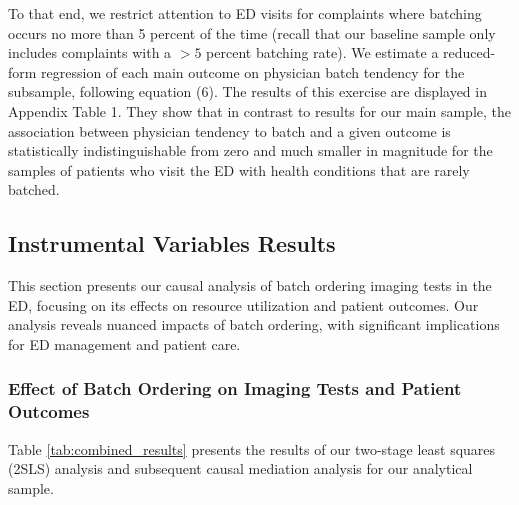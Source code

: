 \documentclass[,,nonblindrev]{informs}
\begin{document}
To that end, we restrict attention to ED visits for complaints where
batching occurs no more than 5 percent of the time (recall that our
baseline sample only includes complaints with a \(>5\) percent batching
rate). We estimate a reduced-form regression of each main outcome on
physician batch tendency for the subsample, following equation (6). The
results of this exercise are displayed in Appendix Table 1. They show
that in contrast to results for our main sample, the association between
physician tendency to batch and a given outcome is statistically
indistinguishable from zero and much smaller in magnitude for the
samples of patients who visit the ED with health conditions that are
rarely batched.

\hypertarget{instrumental-variables-results}{%
\subsection{Instrumental Variables
Results}\label{instrumental-variables-results}}

This section presents our causal analysis of batch ordering imaging
tests in the ED, focusing on its effects on resource utilization and
patient outcomes. Our analysis reveals nuanced impacts of batch
ordering, with significant implications for ED management and patient
care.

\hypertarget{effect-of-batch-ordering-on-imaging-tests-and-patient-outcomes}{%
\subsubsection{Effect of Batch Ordering on Imaging Tests and Patient
Outcomes}\label{effect-of-batch-ordering-on-imaging-tests-and-patient-outcomes}}

Table \ref{tab:combined_results} presents the results of our two-stage
least squares (2SLS) analysis and subsequent causal mediation analysis
for our analytical sample.
\end{document}
